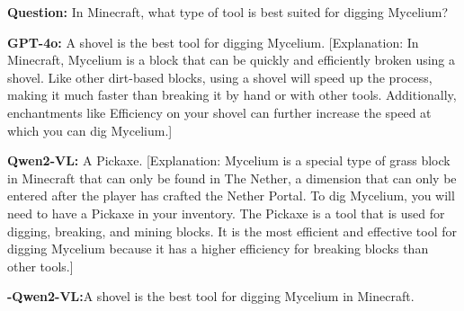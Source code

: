 \begin{table}[ht]
\centering
\caption{Summary of Minecraft knowledge questions and answers evaluation.}
\label{table:knowledge-evaluation}
{\linespread{1.0}\selectfont
{}
}
\end{table}


\begin{prompt}[title={Knowledge Evaluation}, label=Knowledge Evaluation]
\textbf{Question:} In Minecraft, what type of tool is best suited for digging Mycelium?

\textbf{GPT-4o:} A shovel is the best tool for digging Mycelium. [Explanation: In Minecraft, Mycelium is a block that can be quickly and efficiently broken using a shovel. Like other dirt-based blocks, using a shovel will speed up the process, making it much faster than breaking it by hand or with other tools. Additionally, enchantments like Efficiency on your shovel can further increase the speed at which you can dig Mycelium.]

\textbf{Qwen2-VL:} A Pickaxe. [Explanation: Mycelium is a special type of grass block in Minecraft that can only be found in The Nether, a dimension that can only be entered after the player has crafted the Nether Portal. To dig Mycelium, you will need to have a Pickaxe in your inventory. The Pickaxe is a tool that is used for digging, breaking, and mining blocks. It is the most efficient and effective tool for digging Mycelium because it has a higher efficiency for breaking blocks than other tools.]

\textbf{\model-Qwen2-VL:}A shovel is the best tool for digging Mycelium in Minecraft.
\end{prompt}


